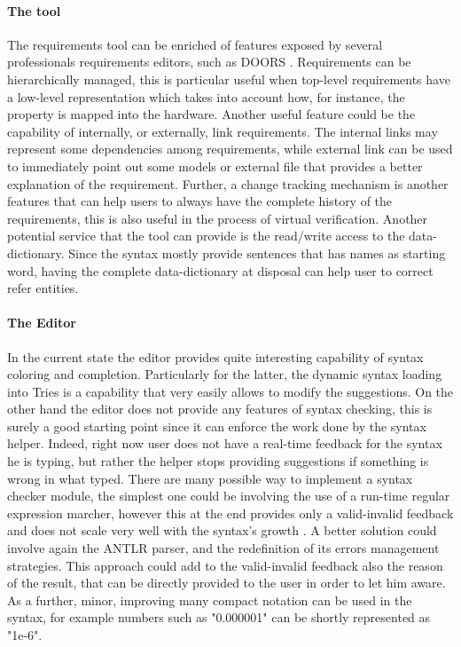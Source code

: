 \paragraph{The tool} The requirements tool can be enriched of features exposed by several professionals requirements editors, such as DOORS \citep{DOORS}. Requirements can be hierarchically managed, this is particular useful when top-level requirements have a low-level representation which takes into account how, for instance, the property is mapped into the hardware. Another useful feature could be the capability of internally, or externally, link requirements. The internal links may represent some dependencies among requirements, while external link can be used to immediately point out some models or external file that provides a better explanation of the requirement. Further, a change tracking mechanism is another features that can help users to always have the complete history of the requirements, this is also useful in the process of virtual verification. Another potential service that the tool can provide is the read/write access to the data-dictionary. Since the syntax mostly provide sentences that has names as starting word, having the complete data-dictionary at disposal can help user to correct refer entities.

\paragraph{The Editor} In the current state the editor provides quite interesting capability of syntax coloring and completion. Particularly for the latter, the dynamic syntax loading into Tries is a capability that very easily allows to modify the suggestions. On the other hand the editor does not provide any features of syntax checking, this is surely a good starting point since it can enforce the work done by the syntax helper. Indeed, right now user does not have a real-time feedback for the syntax he is typing, but rather the helper stops providing suggestions if something is wrong in what typed. There are many possible way to implement a syntax checker module, the simplest one could be involving the use of a run-time regular expression marcher, however this at the end provides only a valid-invalid feedback and does not scale very well with the syntax's growth . A better solution could involve again the ANTLR parser, and the redefinition of its errors management strategies. This approach could add to the valid-invalid feedback also the reason of the result, that can be directly provided to the user in order to let him aware.  As a further, minor, improving many compact notation can be used in the syntax, for example numbers such as "0.000001" can be shortly represented as "1e-6". 

